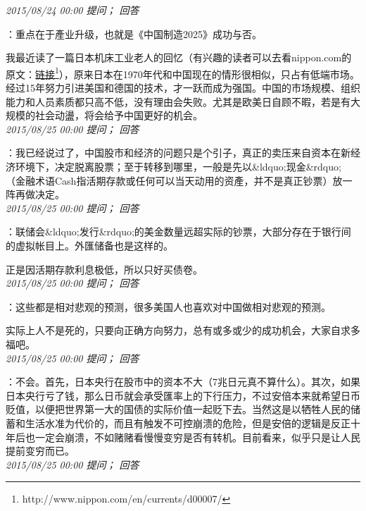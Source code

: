 \documentclass[twocolumn]{ctexart}
\begin{document}
\textit{\hfill\noindent\small 2015/08/24 00:00 提问； 回答}

：重点在于產业升级，也就是《中国制造2025》成功与否。

我最近读了一篇日本机床工业老人的回忆（有兴趣的读者可以去看nippon.com的原文：\href{http://www.nippon.com/en/currents/d00007/}{链接\footnote{\url{http://www.nippon.com/en/currents/d00007/}}}），原来日本在1970年代和中国现在的情形很相似，只占有低端市场。经过15年努力引进美国和德国的技术，才一跃而成为强国。中国的市场规模、组织能力和人员素质都只高不低，没有理由会失败。尤其是欧美日自顾不暇，若是有大规模的社会动盪，将会给予中国更好的机会。\\

\textit{\hfill\noindent\small 2015/08/25 00:00 提问； 回答}

：我已经说过了，中国股市和经济的问题只是个引子，真正的卖压来自资本在新经济环境下，决定脱离股票；至于转移到哪里，一般是先以\&ldquo;现金\&rdquo;（金融术语Cash指活期存款或任何可以当天动用的资產，并不是真正钞票）放一阵再做决定。\\

\textit{\hfill\noindent\small 2015/08/25 00:00 提问； 回答}

：联储会\&ldquo;发行\&rdquo;的美金数量远超实际的钞票，大部分存在于银行间的虚拟帐目上。外匯储备也是这样的。

正是因活期存款利息极低，所以只好买债卷。\\

\textit{\hfill\noindent\small 2015/08/25 00:00 提问； 回答}

：这些都是相对悲观的预测，很多美国人也喜欢对中国做相对悲观的预测。

实际上人不是死的，只要向正确方向努力，总有或多或少的成功机会，大家自求多福吧。\\

\textit{\hfill\noindent\small 2015/08/25 00:00 提问； 回答}

：不会。首先，日本央行在股市中的资本不大（7兆日元真不算什么）。其次，如果日本央行亏了钱，那么日币就会承受匯率上的下行压力，不过安倍本来就希望日币贬值，以便把世界第一大的国债的实际价值一起贬下去。当然这是以牺牲人民的储蓄和生活水准为代价的，而且有触发不可控崩溃的危险，但是安倍的逻辑是反正十年后也一定会崩溃，不如赌赌看慢慢变穷是否有转机。目前看来，似乎只是让人民提前变穷而已。\\

\textit{\hfill\noindent\small 2015/08/25 00:00 提问； 回答}
\end{document}
